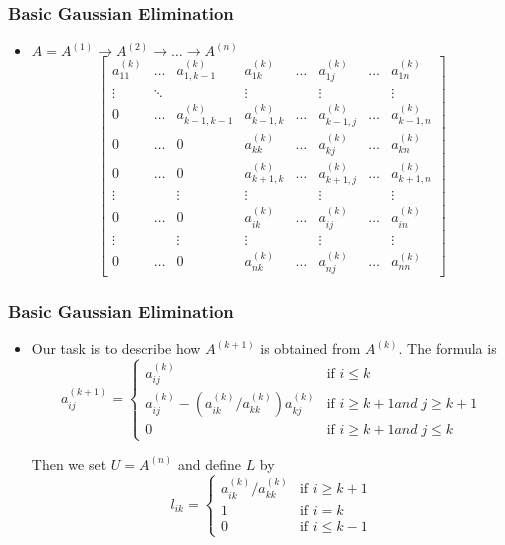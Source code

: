 \documentclass[notheorems,mathserif,table,compress]{beamer}  %
\begin{document}
\begin{frame}
\frametitle{Basic Gaussian Elimination}
\begin{itemize}
\item  $A=A^{(1)}\rightarrow A^{(2)}\rightarrow \ldots \rightarrow A^{(n)}$
\begin{displaymath}
\begin{bmatrix}
a_{11}^{(k)} & \ldots & a_{1,k-1}^{(k)} & a_{1k}^{(k)} & \ldots & a_{1j}^{(k)} & \ldots & a_{1n}^{(k)}\\
\vdots & \ddots &  & \vdots &     & \vdots        & & \vdots \\
0 & \ldots & a_{k-1,k-1}^{(k)} & a_{k-1,k}^{(k)} & \ldots & a_{k-1,j}^{(k)} & \ldots & a_{k-1,n}^{(k)}\\
0 & \ldots & 0 & a_{kk}^{(k)} & \ldots & a_{kj}^{(k)} & \ldots & a_{kn}^{(k)}\\
0 & \ldots & 0 & a_{k+1,k}^{(k)} & \ldots & a_{k+1,j}^{(k)} & \ldots & a_{k+1,n}^{(k)}\\
\vdots &  & \vdots & \vdots & &  \vdots     & & \vdots \\
0 & \ldots & 0 & a_{ik}^{(k)} & \ldots & a_{ij}^{(k)} & \ldots & a_{in}^{(k)}\\
\vdots &  & \vdots & \vdots & &  \vdots     & & \vdots \\
0 & \ldots & 0 & a_{nk}^{(k)} & \ldots & a_{nj}^{(k)} & \ldots & a_{nn}^{(k)}
\end{bmatrix}
\end{displaymath}

\end{itemize}
\end{frame}

\begin{frame}
\frametitle{Basic Gaussian Elimination}
\begin{itemize}
\item Our task is to describe how $A^{(k+1)}$ is obtained from $A^{(k)}$. The formula is 
\begin{displaymath}
a_{ij}^{(k+1)}=\left\{ \begin{array}{ll}
a_{ij}^{(k)} & \textrm{if $i\leq k$}\\
a_{ij}^{(k)}-(a_{ik}^{(k)}/a_{kk}^{(k)})a_{kj}^{(k)} & \textrm{if $i\geq k+1 and\; j\geq k+1$}\\
0 & \textrm{if $i\geq k+1 and\; j\leq k$}
\end{array} \right.
\end{displaymath}

Then we set $U=A^{(n)}$ and define $L$ by
\begin{displaymath}
l_{ik}=\left\{ \begin{array}{ll}
a_{ik}^{(k)}/a_{kk}^{(k)} & \textrm{if $i\geq k+1$}\\
1 & \textrm{if $i=k$}\\
0 & \textrm{if $i\leq k-1$}
\end{array} \right.
\end{displaymath}
\end{itemize}
\end{frame}
\end{document}
